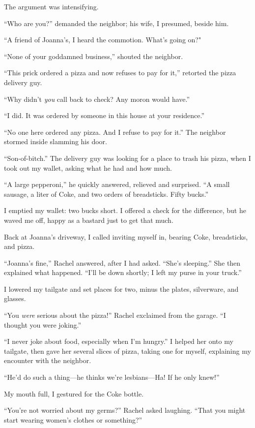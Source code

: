The argument was intensifying.

``Who are you?'' demanded the neighbor; his wife, I presumed, beside
him.

``A friend of Joanna's, I heard the commotion. What's going on?"

``None of your goddamned business,'' shouted the neighbor.

``This prick ordered a pizza and now refuses to pay for it,'' retorted
the pizza delivery guy.

``Why didn't \emph{you} call back to check? Any moron would have.''

``I did. It was ordered by someone in this house at your residence.''

``No one here ordered any pizza. And I refuse to pay for it.'' The
neighbor stormed inside slamming his door.

``Son-of-bitch.'' The delivery guy was looking for a place to trash his
pizza, when I took out my wallet, asking what he had and how much.

``A large pepperoni,'' he quickly answered, relieved and surprised. ``A
small sausage, a liter of Coke, and two orders of breadsticks. Fifty
bucks.''

I emptied my wallet: two bucks short. I offered a check for the
difference, but he waved me off, happy as a bastard just to get that
much.

Back at Joanna's driveway, I called inviting myself in, bearing Coke,
breadsticks, and pizza.

``Joanna's fine,'' Rachel answered, after I had asked. ``She's
sleeping.'' She then explained what happened. ``I'll be down shortly; I
left my purse in your truck.''

I lowered my tailgate and set places for two, minus the plates,
silverware, and glasses.

``You \emph{were} serious about the pizza!'' Rachel exclaimed from the
garage. ``I thought you were joking.''

``I never joke about food, especially when I'm hungry.'' I helped her
onto my tailgate, then gave her several slices of pizza, taking one for
myself, explaining my encounter with the neighbor.

``He'd do such a thing---he thinks we're lesbians---Ha! If he only
knew!''

My mouth full, I gestured for the Coke bottle.

``You're not worried about my germs?'' Rachel asked laughing. ``That you
might start wearing women's clothes or something?''

